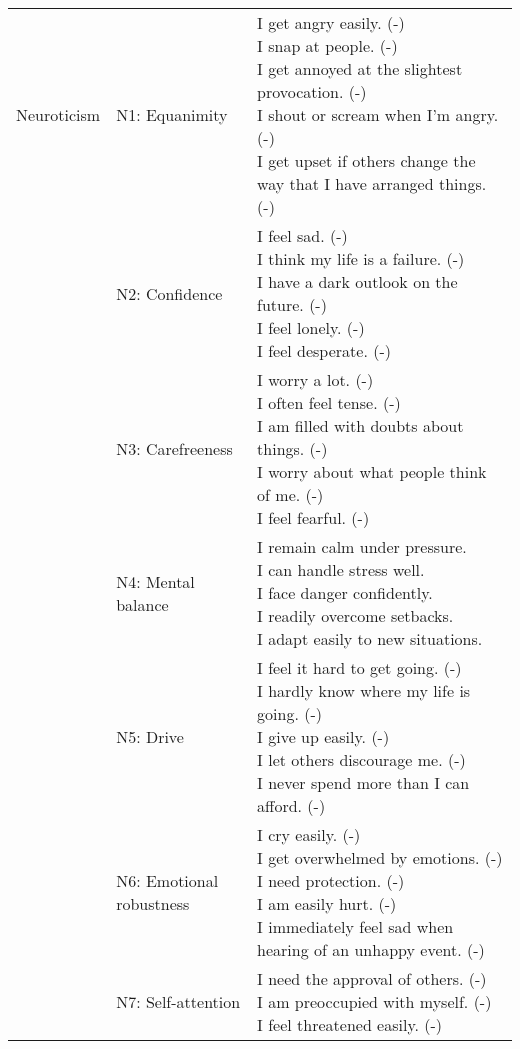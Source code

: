 \documentclass[]{article}
\begin{document}
\begin{longtable}[t]{lll}
\addlinespace
Neuroticism & N1: Equanimity & \makecell[l]{I get angry easily. (-)\\I snap at people. (-)\\I get annoyed at the slightest provocation. (-)\\I shout or scream when I'm angry. (-)\\I get upset if others change the way that I have arranged things. (-)}\\
\addlinespace
 & N2: Confidence & \makecell[l]{I feel sad. (-)\\I think my life is a failure. (-)\\I have a dark outlook on the future. (-)\\I feel lonely. (-)\\I feel desperate. (-)}\\
\addlinespace
 & N3: Carefreeness & \makecell[l]{I worry a lot. (-)\\I often feel tense. (-)\\I am filled with doubts about things. (-)\\I worry about what people think of me. (-)\\I feel fearful. (-)}\\
\addlinespace
 & N4: Mental balance & \makecell[l]{I remain calm under pressure.\\I can handle stress well.\\I face danger confidently.\\I readily overcome setbacks.\\I adapt easily to new situations.}\\
\addlinespace
 & N5: Drive & \makecell[l]{I feel it hard to get going. (-)\\I hardly know where my life is going. (-)\\I give up easily. (-)\\I let others discourage me. (-)\\I never spend more than I can afford. (-)}\\
\addlinespace
 & N6: Emotional robustness & \makecell[l]{I cry easily. (-)\\I get overwhelmed by emotions. (-)\\I need protection. (-)\\I am easily hurt. (-)\\I immediately feel sad when hearing of an unhappy event. (-)}\\
\addlinespace
 & N7: Self-attention & \makecell[l]{I need the approval of others. (-)\\I am preoccupied with myself. (-)\\I feel threatened easily. (-)}\\

\end{longtable}
\end{document}
